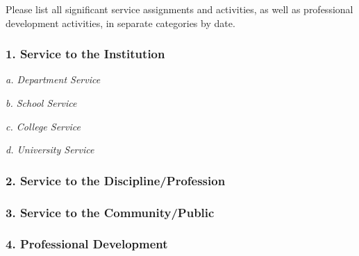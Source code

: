 Please list all significant service assignments and activities, as well as professional development activities, in separate categories by date.

\subsubsection*{1. Service to the Institution}

\textit{a. Department Service}

\textit{b. School Service}

\textit{c. College Service}

\textit{d. University Service}

\subsubsection*{2. Service to the Discipline/Profession}

\subsubsection*{3. Service to the Community/Public}

\subsubsection*{4. Professional Development}
